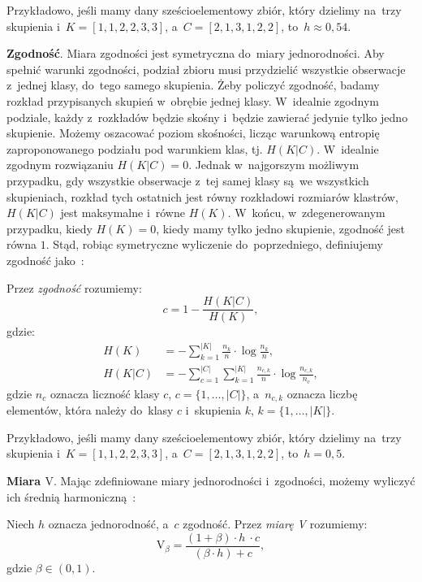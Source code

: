 \documentclass{praca1}
\begin{document}
Przykładowo, jeśli mamy dany sześcioelementowy zbiór, który dzielimy na~trzy skupienia i~$K = [1, 1, 2, 2, 3, 3]$, a~$C = [2, 1, 3, 1, 2, 2]$, to~$h \approx 0{,}54$.

\textbf{Zgodność}. Miara zgodności jest symetryczna do~miary jednorodności. Aby spełnić warunki zgodności, podział zbioru musi przydzielić wszystkie obserwacje z~jednej klasy, do~tego samego skupienia. Żeby policzyć zgodność, badamy rozkład przypisanych skupień w~obrębie jednej klasy. W~idealnie zgodnym podziale, każdy z~rozkładów będzie skośny i~będzie zawierać jedynie tylko jedno skupienie. Możemy oszacować poziom skośności, licząc warunkową entropię zaproponowanego podziału pod warunkiem klas, tj. $H(K|C)$. W~idealnie zgodnym rozwiązaniu $H(K|C) = 0$. Jednak w~najgorszym możliwym przypadku, gdy wszystkie obserwacje z~tej samej klasy są~we wszystkich skupieniach, rozkład tych ostatnich jest równy rozkładowi rozmiarów klastrów, $H(K|C)$ jest maksymalne i~równe $H(K)$. W~końcu, w~zdegenerowanym przypadku, kiedy $H(K) = 0$, kiedy mamy tylko jedno skupienie, zgodność jest równa $1$. Stąd, robiąc symetryczne wyliczenie do~poprzedniego, definiujemy zgodność jako~\cite{Rosenberg2007:vmeasure}:

\begin{definition}
Przez \emph{zgodność} rozumiemy:
\begin{equation}
c = %
1 - \frac{H(K|C)}{H(K)}, %
\end{equation}
gdzie:
\begin{align*}
H(K) & = - \sum\limits_{k = 1}^{|K|}\frac{n_k}{n}\cdot \log{\frac{n_k}{n}},  \\
H(K|C) & = - \sum\limits_{c = 1}^{|C|}\sum\limits_{k = 1}^{|K|}\frac{n_{c,k}}{n}\cdot \log{\frac{n_{c,k}}{n_c}},
\end{align*}
gdzie $n_c$ oznacza liczność klasy $c$, $c = \{1,\ldots, |C|\}$, a~$n_{c,k}$ oznacza liczbę elementów, która należy do~klasy $c$ i~skupienia $k$, $k = \{1,\ldots, |K|\}$.
\end{definition}

Przykładowo, jeśli mamy dany sześcioelementowy zbiór, który dzielimy na~trzy skupienia i~$K = [1, 1, 2, 2, 3, 3]$, a~$C = [2, 1, 3, 1, 2, 2]$, to~$h = 0{,}5$.

\textbf{Miara $\textrm{V}$}. Mając zdefiniowane miary jednorodności i~zgodności, możemy wyliczyć ich średnią harmoniczną~\cite{Rosenberg2007:vmeasure}:

\begin{definition}
Niech $h$ oznacza jednorodność, a~$c$ zgodność. Przez \emph{miarę V} rozumiemy:
\begin{equation}
\textrm{V}_{\beta} = \frac{(1+\beta)\cdot h~\cdot c}{(\beta \cdot h) + c},
\end{equation}
gdzie $\beta \in (0,1)$.
\end{definition}
\end{document}
